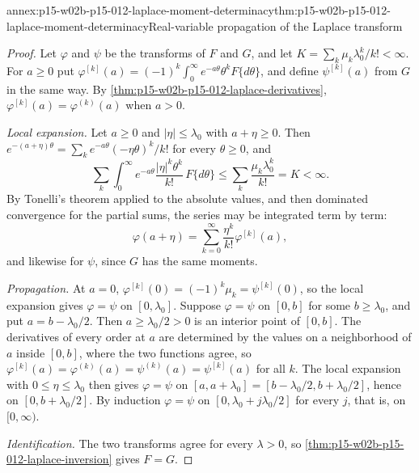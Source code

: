\begin{annexitem}{annex:p15-w02b-p15-012-laplace-moment-determinacy}{thm:p15-w02b-p15-012-laplace-moment-determinacy}{Real-variable propagation of the Laplace transform}
\begin{proof}
Let \(\varphi\) and \(\psi\) be the transforms of \(F\) and \(G\), and let
\(K=\sum_k\mu_k\lambda_0^k/k!<\infty\). For \(a\geq0\) put
\(\varphi^{[k]}(a)=(-1)^k\int_0^\infty e^{-a\theta}\theta^kF\{d\theta\}\),
and define \(\psi^{[k]}(a)\) from \(G\) in the same way. By
\cref{thm:p15-w02b-p15-012-laplace-derivatives},
\(\varphi^{[k]}(a)=\varphi^{(k)}(a)\) when \(a>0\).

\emph{Local expansion.} Let \(a\geq0\) and \(|\eta|\leq\lambda_0\) with
\(a+\eta\geq0\). Then
\(e^{-(a+\eta)\theta}=\sum_ke^{-a\theta}(-\eta\theta)^k/k!\) for every
\(\theta\geq0\), and
\[
 \sum_k\int_0^\infty e^{-a\theta}\frac{|\eta|^k\theta^k}{k!}\,F\{d\theta\}
    \leq\sum_k\frac{\mu_k\lambda_0^k}{k!}=K<\infty .
\]
By Tonelli's theorem applied to the absolute values, and then dominated
convergence for the partial sums, the series may be integrated term by term:
\[
 \varphi(a+\eta)=\sum_{k=0}^\infty\frac{\eta^k}{k!}\varphi^{[k]}(a),
\]
and likewise for \(\psi\), since \(G\) has the same moments.

\emph{Propagation.} At \(a=0\),
\(\varphi^{[k]}(0)=(-1)^k\mu_k=\psi^{[k]}(0)\), so the local expansion gives
\(\varphi=\psi\) on \([0,\lambda_0]\). Suppose \(\varphi=\psi\) on
\([0,b]\) for some \(b\geq\lambda_0\), and put \(a=b-\lambda_0/2\). Then
\(a\geq\lambda_0/2>0\) is an interior point of \([0,b]\). The derivatives of
every order at \(a\) are determined by the values on a neighborhood of \(a\)
inside \([0,b]\), where the two functions agree, so
\(\varphi^{[k]}(a)=\varphi^{(k)}(a)=\psi^{(k)}(a)=\psi^{[k]}(a)\) for all
\(k\). The local expansion with \(0\leq\eta\leq\lambda_0\) then gives
\(\varphi=\psi\) on \([a,a+\lambda_0]=[b-\lambda_0/2,b+\lambda_0/2]\), hence on
\([0,b+\lambda_0/2]\). By induction \(\varphi=\psi\) on
\([0,\lambda_0+j\lambda_0/2]\) for every \(j\), that is, on \([0,\infty)\).

\emph{Identification.} The two transforms agree for every \(\lambda>0\), so
\cref{thm:p15-w02b-p15-012-laplace-inversion} gives \(F=G\).
\end{proof}
\end{annexitem}

